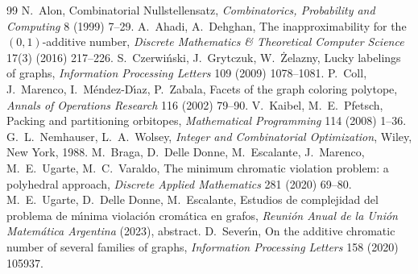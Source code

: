 \documentclass[a4paper,11pt]{article}
\theoremstyle{definition}
\begin{document}
\begin{thebibliography}{99}
 N.~Alon, Combinatorial Nullstellensatz, \emph{Combinatorics, Probability and Computing} 8 (1999) 7--29.
 A.~Ahadi, A.~Dehghan, The inapproximability for the $(0,1)$-additive number,
\emph{Discrete Mathematics \& Theoretical Computer Science} 17(3) (2016) 217--226.
 S.~Czerwi\'nski, J.~Grytczuk, W.~\.Zelazny, Lucky labelings of graphs, \emph{Information Processing Letters} 109 (2009)
1078--1081.
 P.~Coll, J.~Marenco, I.~M\'endez-D\'{\i}az, P.~Zabala, Facets of the graph coloring polytope, \emph{Annals of Operations
Research} 116 (2002) 79--90.
 V.~Kaibel, M.~E.~Pfetsch, Packing and partitioning orbitopes, \emph{Mathematical Programming} 114 (2008) 1--36.
 G.~L.~Nemhauser, L.~A.~Wolsey, \emph{Integer and Combinatorial Optimization}, Wiley, New York, 1988.
 M.~Braga, D.~Delle Donne, M.~Escalante, J.~Marenco, M.~E.~Ugarte, M.~C.~Varaldo,
The minimum chromatic violation problem: a polyhedral approach, \emph{Discrete Applied Mathematics} 281 (2020) 69--80.
 M.~E.~Ugarte, D.~Delle Donne, M.~Escalante, Estudios de complejidad del problema de m\'{\i}nima violaci\'on
crom\'atica en grafos, \emph{Reuni\'on Anual de la Uni\'on Matem\'atica Argentina} (2023), abstract.
 D.~Sever\'{\i}n, On the additive chromatic number of several families of graphs, \emph{Information Processing Letters}
158 (2020) 105937.
\end{thebibliography}
\end{document}
